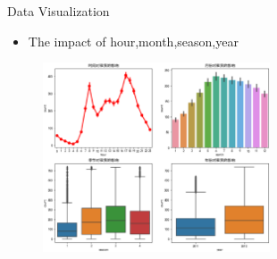 \documentclass[
 size=14pt,
 paper=smartboard,  %
 mode=present, 		%
 display=slides, 	%
 style=tuliplab,  	%
 pauseslide,
 fleqn,leqno]{powerdot}
\begin{document}
\begin{slide}[toc=,bm=]{Data  Visualization}
  \begin{center}

    {
      \begin{itemize}
        
          \item The impact of hour,month,season,year
      \end{itemize} 
        \begin{figure}
          \centering
          \includegraphics[width=0.6\textwidth]{pic/count all (1).eps}
          \centering
        \end{figure} 
    }
    \end{center}
 


\end{slide}

\end{document}
